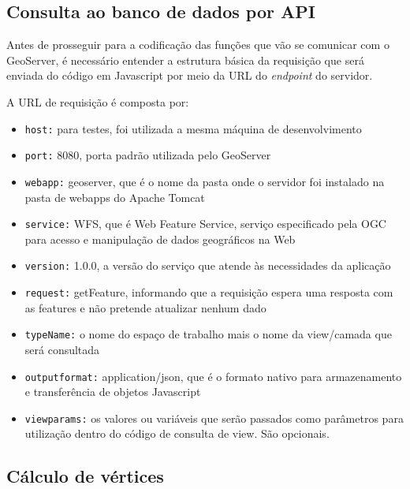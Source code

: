 \documentclass[oneside,openright,12pt]{ufsm_2015} %
\begin{document}
\subsection{Consulta ao banco de dados por API}

Antes de prosseguir para a codificação das funções que vão se comunicar com o GeoServer, é necessário entender a estrutura básica da requisição que será enviada do código em Javascript por meio da URL do \textit{endpoint} do servidor.

A URL de requisição é composta por:

\begin{itemize}
    \item {\tt host:} para testes, foi utilizada a mesma máquina de desenvolvimento
    \item {\tt port:} 8080, porta padrão utilizada pelo GeoServer
    \item {\tt webapp:} geoserver, que é o nome da pasta onde o servidor foi instalado na pasta de webapps do Apache Tomcat
    \item {\tt service:} WFS, que é Web Feature Service, serviço especificado pela OGC para acesso e manipulação de dados geográficos na Web
    \item {\tt version:} 1.0.0, a versão do serviço que atende às necessidades da aplicação 
    \item {\tt request:} getFeature, informando que a requisição espera uma resposta com as features e não pretende atualizar nenhum dado
    \item {\tt typeName:} o nome do espaço de trabalho mais o nome da view/camada que será consultada
    \item {\tt outputformat:} application/json, que é o formato nativo para armazenamento e transferência de objetos Javascript
    \item {\tt viewparams:} os valores ou variáveis que serão passados como parâmetros para utilização dentro do código de consulta de view. São opcionais.
 \end{itemize}

\subsection{Cálculo de vértices}
\end{document}
